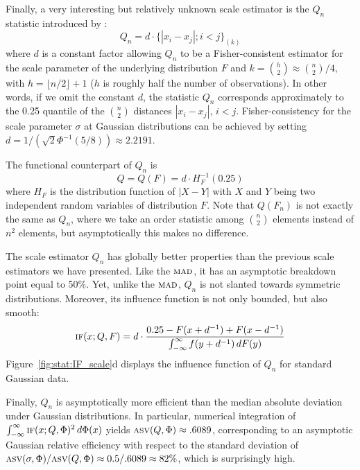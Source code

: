 Finally, a very interesting but relatively unknown scale estimator is the
$Q_n$ statistic introduced by \citet{rousseeuw:croux:1993}:
\[
    Q_n =   d\cdot \{|x_i-x_j|; i<j\}_{(k)}
\]
where $d$ is a constant factor allowing $Q_n$ to be a Fisher-consistent
estimator for the scale parameter of the underlying distribution $F$ and $k =
\binom{h}{2} \approx \binom{n}{2}/4$, with $h = \lfloor n/2\rfloor + 1$ ($h$ is
roughly half the number of observations). In other words, if we omit the
constant $d$, the statistic $Q_n$ corresponds approximately to the 0.25
quantile of the $\binom{n}{2}$ distances $|x_i-x_j|$, $i<j$. Fisher-consistency for the 
scale parameter $\sigma$ at Gaussian distributions can be achieved by setting
$d = 1/\left(\sqrt{2}\Phi^{-1}(5/8)\right) \approx 2.2191$.                     

The functional counterpart of $Q_n$ is 
\[
    Q = Q(F) = d\cdot H_{F}^{-1}(0.25)
\]
where $H_{F}$ is the distribution function of $|X-Y|$ with $X$ and $Y$ being two
independent random variables of distribution $F$. Note that $Q(F_n)$ is not
exactly the same as $Q_n$, where we take an order statistic among $\binom{n}{2}$
elements instead of $n^2$ elements, but asymptotically this makes no difference.

The scale estimator $Q_n$ has globally better properties than the previous
scale estimators we have presented. Like the $\stsc{MAD}$, it has an asymptotic
breakdown point equal to 50\%. Yet, unlike the $\stsc{MAD}$, $Q_n$ is not
slanted towards symmetric distributions. Moreover, its influence function is
not only bounded, but also smooth:                                              
\[
    \stsc{IF}(x; Q, F) = d\cdot \frac{0.25 - F(x+d^{-1}) + F(x-d^{-1})}{\int_{-\infty}^\infty f(y+d^{-1}) \dif F(y)}
\]
Figure~\ref{fig:stat:IF_scale}d displays the influence function of $Q_n$ for 
standard Gaussian data.                                                         

Finally, $Q_n$ is asymptotically more efficient than the median absolute
deviation under Gaussian distributions. In particular, numerical integration of
$\int_{-\infty}^\infty \stsc{IF}(x;Q,\Phi)^2 \dif \Phi(x)$ yields
$\stsc{ASV}(Q,\Phi) \approx .6089$, corresponding to an asymptotic Gaussian        
relative efficiency with respect to the standard deviation of
$\stsc{ASV}(\sigma, \Phi) / \stsc{ASV}(Q, \Phi) \approx 0.5/.6089 \approx 82\%$,
which is surprisingly high.

